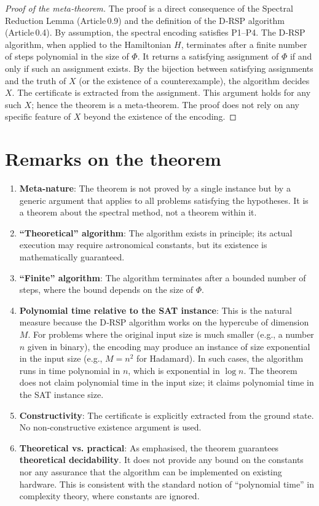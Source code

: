 \documentclass[11pt,a4paper]{article}
\begin{document}
\begin{proof}[Proof of the meta‑theorem]
The proof is a direct consequence of the Spectral Reduction Lemma (Article 0.9) and the definition of the D‑RSP algorithm (Article 0.4). By assumption, the spectral encoding satisfies P1–P4. The D‑RSP algorithm, when applied to the Hamiltonian \(H\), terminates after a finite number of steps polynomial in the size of \(\Phi\). It returns a satisfying assignment of \(\Phi\) if and only if such an assignment exists. By the bijection between satisfying assignments and the truth of \(X\) (or the existence of a counterexample), the algorithm decides \(X\). The certificate is extracted from the assignment. This argument holds for any such \(X\); hence the theorem is a meta‑theorem. The proof does not rely on any specific feature of \(X\) beyond the existence of the encoding.
\end{proof}

\section{Remarks on the theorem}

\begin{enumerate}
\item \textbf{Meta‑nature}: The theorem is not proved by a single instance but by a generic argument that applies to all problems satisfying the hypotheses. It is a theorem about the spectral method, not a theorem within it.
\item \textbf{“Theoretical” algorithm}: The algorithm exists in principle; its actual execution may require astronomical constants, but its existence is mathematically guaranteed.
\item \textbf{“Finite” algorithm}: The algorithm terminates after a bounded number of steps, where the bound depends on the size of \(\Phi\).
\item \textbf{Polynomial time relative to the SAT instance}: This is the natural measure because the D‑RSP algorithm works on the hypercube of dimension \(M\). For problems where the original input size is much smaller (e.g., a number \(n\) given in binary), the encoding may produce an instance of size exponential in the input size (e.g., \(M = n^{2}\) for Hadamard). In such cases, the algorithm runs in time polynomial in \(n\), which is exponential in \(\log n\). The theorem does not claim polynomial time in the input size; it claims polynomial time in the SAT instance size.
\item \textbf{Constructivity}: The certificate is explicitly extracted from the ground state. No non‑constructive existence argument is used.
\item \textbf{Theoretical vs. practical}: As emphasised, the theorem guarantees \textbf{theoretical decidability}. It does not provide any bound on the constants nor any assurance that the algorithm can be implemented on existing hardware. This is consistent with the standard notion of “polynomial time” in complexity theory, where constants are ignored.
\end{enumerate}
\end{document}

